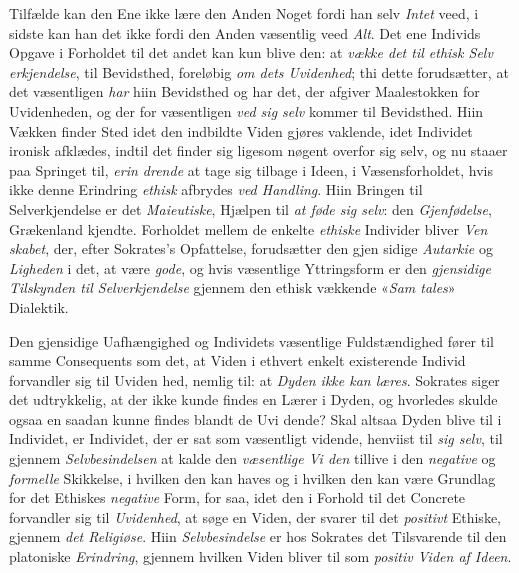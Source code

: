 Tilfælde kan den Ene ikke lære den Anden Noget fordi han
selv \emph{Intet} veed, i sidste kan han det ikke fordi den Anden
væsentlig veed \emph{Alt}. Det ene Individs Opgave i Forholdet til
det andet kan kun blive den: at \emph{vække det til ethisk Selv\-%
erkjendelse}, til Bevidsthed, foreløbig \emph{om dets Uvidenhed};
thi dette forudsætter, at det væsentligen \emph{har} hiin Bevidsthed
og har det, der afgiver Maalestokken for Uvidenheden, og der\-%
for væsentligen \emph{ved sig selv} kommer til Bevidsthed. Hiin
Vækken finder Sted idet den indbildte Viden gjøres vaklende,
idet Individet ironisk afklædes, indtil det finder sig ligesom
nøgent overfor sig selv, og nu staaer paa Springet til, \emph{erin\-%
drende} at tage sig tilbage i Ideen, i Væsensforholdet, hvis
ikke denne Erindring \emph{ethisk} afbrydes \emph{ved Handling}. Hiin
Bringen til Selverkjendelse er det \emph{Maieutiske}, Hjælpen til
\emph{at føde sig selv}: den \emph{Gjenfødelse}, Grækenland kjendte.
Forholdet mellem de enkelte \emph{ethiske} Individer bliver \emph{Ven\-%
skabet}, der, efter Sokrates's Opfattelse, forudsætter den gjen\-%
sidige \emph{Autarkie} og \emph{Ligheden} i det, at være \emph{gode}, og hvis
væsentlige Yttringsform er den \emph{gjensidige Tilskynden
til Selverkjendelse} gjennem den ethisk vækkende «\emph{Sam\-%
tales}» Dialektik.

Den gjensidige Uafhængighed og Individets væsentlige
Fuldstændighed fører til samme Consequents som det, at Viden
i ethvert enkelt existerende Individ forvandler sig til Uviden\-%
hed, nemlig til: at \emph{Dyden ikke kan læres}. Sokrates siger det
udtrykkelig, at der ikke kunde findes en Lærer i Dyden, og
hvorledes skulde ogsaa en saadan kunne findes blandt de Uvi\-%
dende? Skal altsaa Dyden blive til i Individet, er Individet,
der er sat som væsentligt vidende, henviist til \emph{sig selv}, til
gjennem \emph{Selvbesindelsen} at kalde den \emph{væsentlige Vi\-%
den} tillive i den \emph{negative} og \emph{formelle} Skikkelse, i hvilken
den kan haves og i hvilken den kan være Grundlag for det
Ethiskes \emph{negative} Form, for saa, idet den i Forhold til det
Concrete forvandler sig til \emph{Uvidenhed}, at søge en Viden,
der svarer til det \emph{positivt} Ethiske, gjennem \emph{det Religiøse}.
Hiin \emph{Selvbesindelse} er hos Sokrates det Tilsvarende til den
platoniske \emph{Erindring}, gjennem hvilken Viden bliver til som
\emph{positiv Viden af Ideen}.

